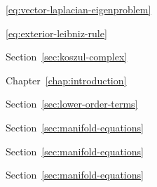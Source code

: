 \par\noindent\hspace*{1em}\label{index:laplacian-vector}\quad \eqref{eq:vector-laplacian-eigenproblem}

\par\noindent\hspace*{0em}\label{index:leibniz-rule}\quad \eqref{eq:exterior-leibniz-rule}

\par\noindent\hspace*{1em}\label{index:leibniz-rule-for-koszul-differential}\quad Section~\ref{sec:koszul-complex}

\par\noindent\hspace*{0em}\label{index:load-vector}\quad Chapter~\ref{chap:introduction}

\par\noindent\hspace*{0em}\label{index:lower-order-terms}\quad Section~\ref{sec:lower-order-terms}

\par\noindent\hspace*{0em}\label{index:manifold}

\par\noindent\hspace*{1em}\label{index:manifold-piecewise-flat}\quad Section~\ref{sec:manifold-equations}

\par\noindent\hspace*{1em}\label{index:manifold-polyhedral}\quad Section~\ref{sec:manifold-equations}

\par\noindent\hspace*{0em}\label{index:manifolds-pdes-on}\quad Section~\ref{sec:manifold-equations}

